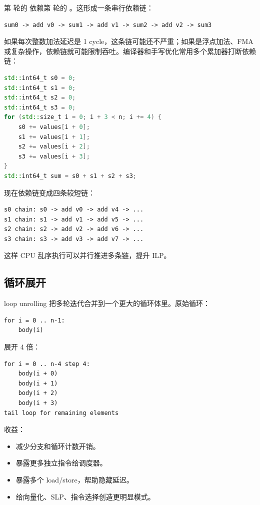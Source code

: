 第  轮的  依赖第  轮的 。这形成一条串行依赖链：

\begin{lstlisting}
sum0 -> add v0 -> sum1 -> add v1 -> sum2 -> add v2 -> sum3
\end{lstlisting}

如果每次整数加法延迟是 1 cycle，这条链可能还不严重；如果是浮点加法、FMA 或复杂操作，依赖链就可能限制吞吐。编译器和手写优化常用多个累加器打断依赖链：

\begin{lstlisting}[language=C++]
std::int64_t s0 = 0;
std::int64_t s1 = 0;
std::int64_t s2 = 0;
std::int64_t s3 = 0;
for (std::size_t i = 0; i + 3 < n; i += 4) {
    s0 += values[i + 0];
    s1 += values[i + 1];
    s2 += values[i + 2];
    s3 += values[i + 3];
}
std::int64_t sum = s0 + s1 + s2 + s3;
\end{lstlisting}

现在依赖链变成四条较短链：

\begin{lstlisting}
s0 chain: s0 -> add v0 -> add v4 -> ...
s1 chain: s1 -> add v1 -> add v5 -> ...
s2 chain: s2 -> add v2 -> add v6 -> ...
s3 chain: s3 -> add v3 -> add v7 -> ...
\end{lstlisting}

这样 CPU 乱序执行可以并行推进多条链，提升 ILP。

\subsection{循环展开}

loop unrolling 把多轮迭代合并到一个更大的循环体里。原始循环：

\begin{lstlisting}
for i = 0 .. n-1:
    body(i)
\end{lstlisting}

展开 4 倍：

\begin{lstlisting}
for i = 0 .. n-4 step 4:
    body(i + 0)
    body(i + 1)
    body(i + 2)
    body(i + 3)
tail loop for remaining elements
\end{lstlisting}

收益：

\begin{itemize}
  \item 减少分支和循环计数开销。
  \item 暴露更多独立指令给调度器。
  \item 暴露多个 load/store，帮助隐藏延迟。
  \item 给向量化、SLP、指令选择创造更明显模式。
\end{itemize}


